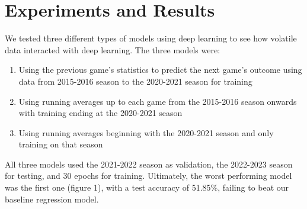 \documentclass[10pt,twocolumn,letterpaper]{article}
\begin{document}



\section{Experiments and Results}

We tested three different types of models using deep learning to see how volatile data interacted with deep learning. The three models were:

\begin{enumerate}
    \item Using the previous game's statistics to predict the next game's outcome using data from 2015-2016 season to the 2020-2021 season for training
    \item Using running averages up to each game from the 2015-2016 season onwards with training ending at the 2020-2021 season
    \item Using running averages beginning with the 2020-2021 season and only training on that season
\end{enumerate}

All three models used the 2021-2022 season as validation, the 2022-2023 season for testing, and 30 epochs for training. Ultimately, the worst performing model was the first one (figure 1), with a test accuracy of 51.85\%, failing to beat our baseline regression model. \\
\end{document}
